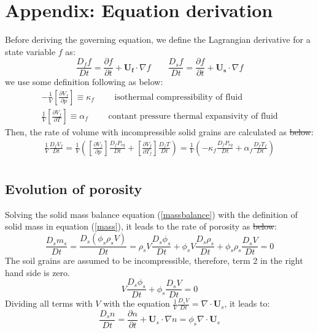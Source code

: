\documentclass[preprint,12pt]{elsarticle}
\providecommand{\DIFadd}[1]{{\protect\color{blue}\uwave{#1}}} %
\providecommand{\DIFdel}[1]{{\protect\color{red}\sout{#1}}}                      %
\providecommand{\DIFaddbegin}{} %
\providecommand{\DIFaddend}{} %
\providecommand{\DIFdelbegin}{} %
\providecommand{\DIFdelend}{} %
\newcommand{\DIFscaledelfig}{0.5}
\newlength{\DIFdelgraphicswidth} %
\newlength{\DIFdelgraphicsheight} %
\newcommand{\DIFaddincludegraphics}[2][]{{\color{blue}\fbox{\DIFOincludegraphics[#1]{#2}}}} %
\newcommand{\DIFdelincludegraphics}[2][]{%
\sbox{\DIFdelgraphicsbox}{\DIFOincludegraphics[#1]{#2}}%
\settoboxwidth{\DIFdelgraphicswidth}{\DIFdelgraphicsbox} %
\settoboxtotalheight{\DIFdelgraphicsheight}{\DIFdelgraphicsbox} %
\scalebox{\DIFscaledelfig}{%
\parbox[b]{\DIFdelgraphicswidth}{\usebox{\DIFdelgraphicsbox}\\[-\baselineskip] \rule{\DIFdelgraphicswidth}{0em}}\llap{\resizebox{\DIFdelgraphicswidth}{\DIFdelgraphicsheight}{%
\setlength{\unitlength}{\DIFdelgraphicswidth}%
\begin{picture}(1,1)%
\thicklines\linethickness{2pt} %
{\color[rgb]{1,0,0}\put(0,0){\framebox(1,1){}}}%
{\color[rgb]{1,0,0}\put(0,0){\line( 1,1){1}}}%
{\color[rgb]{1,0,0}\put(0,1){\line(1,-1){1}}}%
\end{picture}%
}\hspace*{3pt}}} %
} %
\DeclareRobustCommand{\DIFaddbegin}{\DIFOaddbegin \let\includegraphics\DIFaddincludegraphics} %
\DeclareRobustCommand{\DIFaddend}{\DIFOaddend \let\includegraphics\DIFOincludegraphics} %
\DeclareRobustCommand{\DIFdelbegin}{\DIFOdelbegin \let\includegraphics\DIFdelincludegraphics} %
\DeclareRobustCommand{\DIFdelend}{\DIFOaddend \let\includegraphics\DIFOincludegraphics} %
\begin{document}

\section{\textsf{Appendix: Equation derivation}}
%
%
Before deriving the governing equation, we define the Lagrangian derivative for a state variable $f$ as:
%
%
\begin{equation}
\frac{D_f f}{Dt} =  \frac{\partial f}{\partial t} + \pmb{U_f} \cdot \nabla f \qquad
\frac{D_s f}{Dt} =  \frac{\partial f}{\partial t} + \pmb{U_s} \cdot \nabla f
\end {equation}
%
%
we use some definition following \cite{Kashiwa} as below:
%
%
\begin{gather}
-\frac{1}{V} \left[ \frac{\partial V_f}{\partial p} \right] \equiv \kappa_f \qquad \mbox{ isothermal compressibility of fluid} \\
\frac{1}{V} \left[ \frac{\partial V_f}{\partial T} \right] \equiv \alpha_f \qquad \mbox{ contant pressure thermal expansivity of fluid}
\end {gather}
%
%
Then, the rate of volume with incompressible solid grains are calculated as \DIFdelbegin \DIFdel{below}\DIFdelend \DIFaddbegin \DIFadd{belows}\DIFaddend :
%
%
\begin{equation}
\label{fluidvolumerate}
\begin{gathered}
   \frac{1}{V} \frac{D_f V_f}{Dt} = \frac{1}{V} \left( \left[ \frac{\partial V_f}{\partial p} \right] \frac{D_f P_{eq}}{D t} + \left[ \frac{\partial V_f}{\partial T_f} \right] \frac{D_f T}{D t} \right) = \frac{1}{V} \left( -\kappa_f \frac{D_f P_{eq}}{D t} + \alpha_f \frac{D_f T_f}{D t} \right) \\
\end {gathered}
\end {equation}
%
%
\subsection{\textsf{Evolution of porosity}}
%
%
Solving the solid mass balance equation (\ref{massbalance}) with the definition of solid mass in equation (\ref{mass}), it leads to the rate of porosity as \DIFdelbegin \DIFdel{below}\DIFdelend \DIFaddbegin \DIFadd{belows}\DIFaddend :
%
%
\begin{equation}
   \frac{D_sm_s}{Dt} = \frac{D_s(\phi_s \rho_s V)}{Dt} = \rho_s V \frac{D_s \phi_s}{Dt} + \phi_s V \frac{D_s \rho_s}{Dt} + \phi_s \rho_s  \frac{D_s V}{Dt} = 0  
\end {equation}
%
%
The soil grains are assumed to be incompressible, therefore, term 2 in the right hand side is zero. \DIFaddbegin \DIFadd{leading to:
}\DIFaddend %
%
\begin{equation}
  V \frac{D_s \phi_s}{Dt} + \phi_s \frac{D_s V}{Dt} = 0  
\end {equation}
%
%
Dividing all terms with $V$ with the equation $\frac{1}{V} \frac{D_s V}{Dt} = \nabla \cdot \pmb{U}_s $, it leads to:
%
%
\begin{equation}
  \frac{D_s n}{Dt} = \frac{\partial n}{\partial t} + \pmb{U}_s \cdot \nabla n = 
  \phi_s \nabla \cdot \pmb{U}_s  
\end {equation}
%
%
\end{document}
